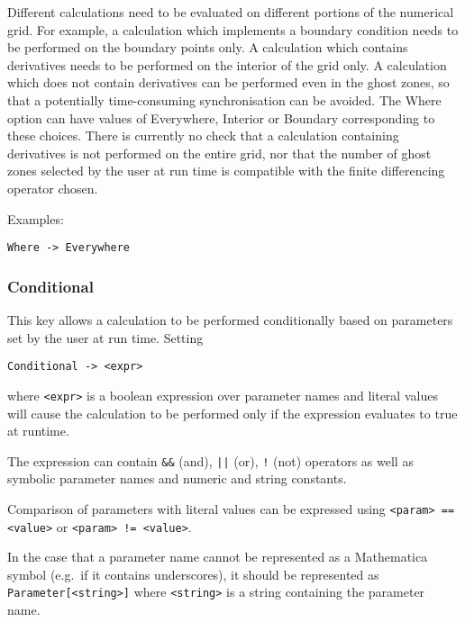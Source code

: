 \documentclass{report}
\begin{document}
Different calculations need to be evaluated on different portions of
the numerical grid.  For example, a calculation which implements a
boundary condition needs to be performed on the boundary points only.
A calculation which contains derivatives needs to be performed on the
interior of the grid only.  A calculation which does not contain
derivatives can be performed even in the ghost zones, so that a
potentially time-consuming synchronisation can be avoided.  The Where
option can have values of Everywhere, Interior or Boundary
corresponding to these choices.  There is currently no check that a
calculation containing derivatives is not performed on the entire
grid, nor that the number of ghost zones selected by the user at run
time is compatible with the finite differencing operator chosen.

Examples:
\begin{center}
\begin{minipage}{0.8 \textwidth}
\begin{verbatim}
Where -> Everywhere
\end{verbatim}
\end{minipage}
\end{center}

\subsubsection{Conditional}

This key allows a calculation to be performed conditionally based on
parameters set by the user at run time.  Setting
\begin{center}
\begin{minipage}{0.8 \textwidth}
\begin{verbatim}
Conditional -> <expr>
\end{verbatim}
\end{minipage}
\end{center}
where \verb|<expr>| is a boolean expression over parameter names and
literal values will cause the calculation to be performed only if the
expression evaluates to true at runtime.

The expression can contain \verb|&&| (and), \verb!||! (or), \verb|!|
(not) operators as well as symbolic parameter names and numeric and
string constants.

Comparison of parameters with literal values can be expressed using
\verb|<param> == <value>| or \verb|<param> != <value>|.

In the case that a parameter name cannot be represented as a
Mathematica symbol (e.g.~if it contains underscores), it should be
represented as \verb|Parameter[<string>]| where \verb|<string>| is a
string containing the parameter name.
\end{document}
